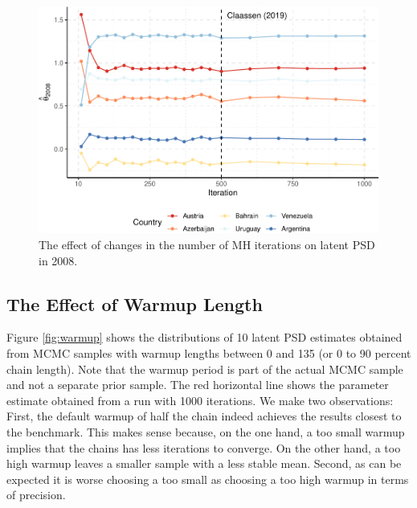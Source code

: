 \documentclass[12pt,english,a4paper,oneside]{article}
\theoremstyle{definition}
\theoremstyle{definition}
\theoremstyle{definition}
\theoremstyle{definition}
\theoremstyle{remark}
\begin{document}
\begin{figure}[H]
\includegraphics[width=\textwidth]{figs/niter-1} \caption[The effect of changes in the number of MH iterations on latent PSD in 2008]{The effect of changes in the number of MH iterations on latent PSD in 2008.}\label{fig:niter}
\end{figure}

\hypertarget{the-effect-of-warmup-length}{%
\subsection{The Effect of Warmup Length}\label{the-effect-of-warmup-length}}

Figure \ref{fig:warmup} shows the distributions of 10 latent PSD estimates obtained from MCMC samples with warmup lengths between 0 and 135 (or 0 to 90 percent chain length). Note that the warmup period is part of the actual MCMC sample and not a separate prior sample. The red horizontal line shows the parameter estimate obtained from a run with 1000 iterations. We make two observations: First, the default warmup of half the chain indeed achieves the results closest to the benchmark. This makes sense because, on the one hand, a too small warmup implies that the chains has less iterations to converge. On the other hand, a too high warmup leaves a smaller sample with a less stable mean. Second, as can be expected it is worse choosing a too small as choosing a too high warmup in terms of precision.
\end{document}
